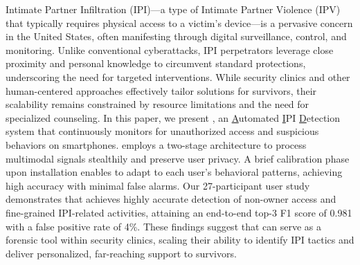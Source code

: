 Intimate Partner Infiltration (IPI)—a type of Intimate Partner Violence (IPV) that typically requires physical access to a victim’s device—is a pervasive concern in the United States, often manifesting through digital surveillance, control, and monitoring. Unlike conventional cyberattacks, IPI perpetrators leverage close proximity and personal knowledge to circumvent standard protections, underscoring the need for targeted interventions. While security clinics and other human-centered approaches effectively tailor solutions for survivors, their scalability remains constrained by resource limitations and the need for specialized counseling. In this paper, we present \sys, an \underline{A}utomated \underline{I}PI \underline{D}etection system that continuously monitors for unauthorized access and suspicious behaviors on smartphones. \sys employs a two-stage architecture to process multimodal signals stealthily and preserve user privacy. A brief calibration phase upon installation enables \sys to adapt to each user’s behavioral patterns, achieving high accuracy with minimal false alarms. Our 27-participant user study demonstrates that \sys achieves highly accurate detection of non-owner access and fine-grained IPI-related activities, attaining an end-to-end top-3 F1 score of 0.981 with a false positive rate of 4\%. These findings suggest that \sys can serve as a forensic tool within security clinics, scaling their ability to identify IPI tactics and deliver personalized, far-reaching support to survivors.